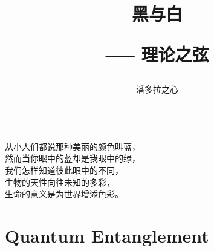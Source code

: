 \documentclass[10pt]{article}
\title{黑与白 \hspace{2pt}\hspace{2pt} \begin{large}----- \hspace{2pt} 理论之弦 \end{large}}
\author{潘多拉之心}
\begin{document}
\maketitle

\begin{center}
\begin{spacing}{2.0}
\\
从小人们都说那种美丽的颜色叫蓝，\\
然而当你眼中的蓝却是我眼中的绿，\\
我们怎样知道彼此眼中的不同，\\
生物的天性向往未知的多彩，\\
生命的意义是为世界增添色彩。
\end{spacing}
\end{center}


\newpage
\section{Quantum Entanglement}
\end{document}
